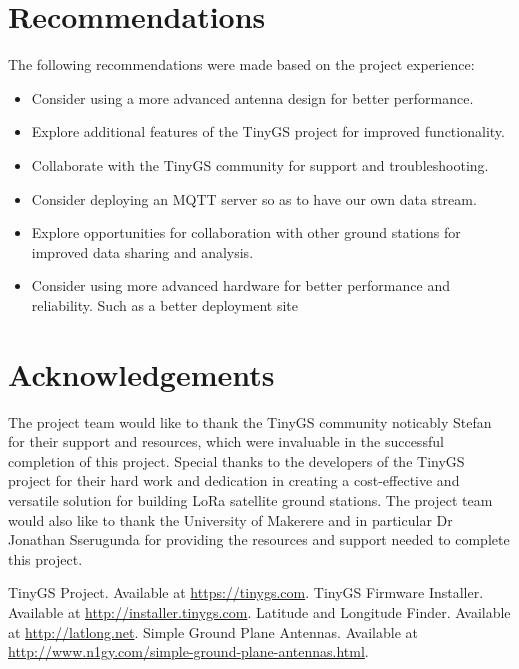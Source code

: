\documentclass[12pt,a4paper]{article}
\begin{document}
\section{Recommendations}
The following recommendations were made based on the project experience:
\begin{itemize}
    \item Consider using a more advanced antenna design for better performance.
    \item Explore additional features of the TinyGS project for improved functionality.
    \item Collaborate with the TinyGS community for support and troubleshooting.
    \item Consider deploying an MQTT server so as to have our own data stream.
    \item Explore opportunities for collaboration with other ground stations for improved data sharing and analysis.
    \item Consider using more advanced hardware for better performance and reliability. Such as a better deployment site
\end{itemize}
\section{Acknowledgements}
The project team would like to thank the TinyGS community noticably Stefan for their support and resources, which were invaluable in the successful completion of this project. Special thanks to the developers of the TinyGS project for their hard work and dedication in creating a cost-effective and versatile solution for building LoRa satellite ground stations.
The project team would also like to thank the University of Makerere and in particular Dr Jonathan Sserugunda for providing the resources and support needed to complete this project.


\begin{thebibliography}{1}
     TinyGS Project. Available at \url{https://tinygs.com}.
     TinyGS Firmware Installer. Available at \url{http://installer.tinygs.com}.
     Latitude and Longitude Finder. Available at \url{http://latlong.net}.
     Simple Ground Plane Antennas. Available at \url{http://www.n1gy.com/simple-ground-plane-antennas.html}.
\end{thebibliography}
\end{document}
